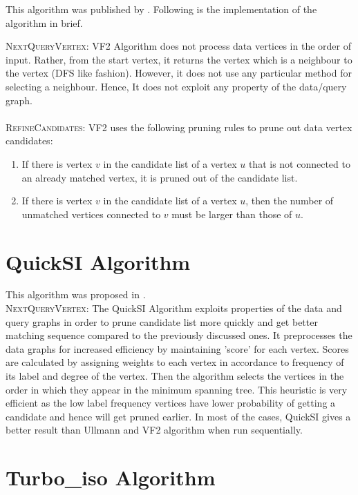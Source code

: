 This algorithm was published by \cite{vf2}. Following is the implementation of the algorithm in brief.

\textsc{NextQueryVertex:} VF2 Algorithm does not process data vertices in the order of input. Rather, from the start vertex, it returns the vertex which is a neighbour to the vertex (DFS like fashion). However, it does not use any particular method for selecting a neighbour. Hence, It does not exploit any property of the data/query graph.\\
\\
\textsc{RefineCandidates:} VF2 uses the following pruning
rules to prune out data vertex candidates:
\begin{enumerate}
    \item If there is vertex $v$ in the candidate list of a vertex $u$ that is not  connected to an already matched vertex, it is pruned out of the candidate list.
    \item If there is vertex $v$ in the candidate list of a vertex $u$, then the number of unmatched vertices connected to $v$ must be larger than those of $u$.
\end{enumerate}

\section{QuickSI Algorithm}

This algorithm was proposed in \cite{quicksi}.\\
\textsc{NextQueryVertex:} The QuickSI Algorithm exploits properties of the data and query graphs in order to prune candidate list more quickly and get better matching sequence compared to the previously discussed ones. It preprocesses the data graphs for increased efficiency by maintaining 'score' for each vertex. Scores are calculated by assigning weights to each vertex in accordance to frequency of its label and degree of the vertex. Then the algorithm selects the vertices in the order in which they appear in the minimum spanning tree. This heuristic is very efficient as the low label frequency vertices have lower probability of getting a candidate and hence will get pruned earlier. In most of the cases, QuickSI gives a better result than Ullmann and VF2 algorithm when run sequentially.


\section{Turbo\_iso Algorithm}

